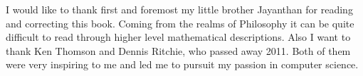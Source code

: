 %
%


I would like to thank first and foremost my little brother Jayanthan for reading and correcting
this book. Coming from the realms of Philosophy it can be quite difficult to read through higher level
mathematical descriptions. Also I want to thank Ken Thomson and Dennis Ritchie, who passed away 2011. Both of them were very inspiring to me and led me to pursuit my passion in computer science.

